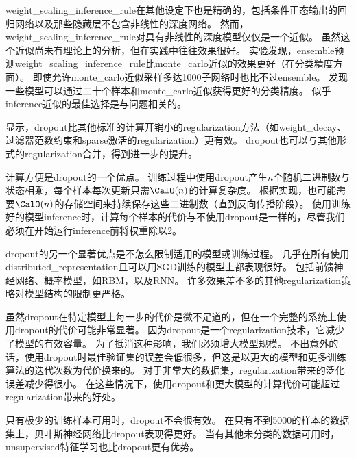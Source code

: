 
\gls{weight_scaling_inference_rule}在其他设定下也是精确的，包括条件正态输出的回归网络以及那些隐藏层不包含非线性的深度网络。
然而，\gls{weight_scaling_inference_rule}对具有非线性的深度模型仅仅是一个近似。
虽然这个近似尚未有理论上的分析，但在实践中往往效果很好。
\cite{Goodfellow-et-al-2013a}实验发现，\gls{ensemble}预测\gls{weight_scaling_inference_rule}比\gls{monte_carlo}近似的效果更好（在分类精度方面）。
即使允许\gls{monte_carlo}近似采样多达1000子网络时也比不过\gls{ensemble}。
\cite{Gal-Ghahramani-2015}发现一些模型可以通过二十个样本和\gls{monte_carlo}近似获得更好的分类精度。
似乎\gls{inference}近似的最佳选择是与问题相关的。

\cite{Srivastava-et-al-2014}显示，\gls{dropout}比其他标准的计算开销小的\gls{regularization}方法（如\gls{weight_decay}、过滤器范数约束和\gls{sparse}激活的\gls{regularization}）更有效。
\gls{dropout}也可以与其他形式的\gls{regularization}合并，得到进一步的提升。

计算方便是\gls{dropout}的一个优点。
训练过程中使用\gls{dropout}产生$n$个随机二进制数与状态相乘，每个样本每次更新只需$\CalO(n)$的计算复杂度。
根据实现，也可能需要$\CalO(n)$的存储空间来持续保存这些二进制数（直到反向传播阶段）。
使用训练好的模型\gls{inference}时，计算每个样本的代价与不使用\gls{dropout}是一样的，尽管我们必须在开始运行\gls{inference}前将权重除以2。


\gls{dropout}的另一个显著优点是不怎么限制适用的模型或训练过程。
几乎在所有使用\gls{distributed_representation}且可以用\gls{SGD}训练的模型上都表现很好。
包括前馈神经网络、概率模型，如\gls{RBM}\citep{Srivastava-et-al-2014}，以及\gls{RNN}\citep{Bayer-Osendorfer-2014,Pascanu-et-al-2014a}。
许多效果差不多的其他\gls{regularization}策略对模型结构的限制更严格。

虽然\gls{dropout}在特定模型上每一步的代价是微不足道的，但在一个完整的系统上使用\gls{dropout}的代价可能非常显著。
因为\gls{dropout}是一个\gls{regularization}技术，它减少了模型的有效容量。
为了抵消这种影响，我们必须增大模型规模。
不出意外的话，使用\gls{dropout}时最佳验证集的误差会低很多，但这是以更大的模型和更多训练算法的迭代次数为代价换来的。
对于非常大的数据集，\gls{regularization}带来的泛化误差减少得很小。
在这些情况下，使用\gls{dropout}和更大模型的计算代价可能超过\gls{regularization}带来的好处。

只有极少的训练样本可用时，\gls{dropout}不会很有效。
在只有不到5000的样本的数据集上\citep{Neal-1996}，贝叶斯神经网络\citep{Xiong-et-al-2011}比\gls{dropout}表现得更好\citep{Srivastava-et-al-2014}。
当有其他未分类的数据可用时，\gls{unsupervised}特征学习也比\gls{dropout}更有优势。


